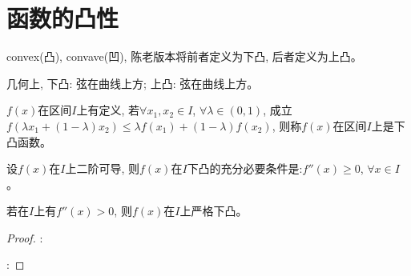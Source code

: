 \section{函数的凸性}
convex(凸), convave(凹), 陈老版本将前者定义为下凸, 后者定义为上凸。

几何上, 下凸: 弦在曲线上方; 上凸: 弦在曲线上方。

\begin{definition}
    $f(x)$在区间$I$上有定义, 若$\forall x_1, x_2 \in I$, $\forall \lambda \in (0, 1)$, 成立$f(\lambda x_1 + (1-\lambda)x_2) \le \lambda f(x_1) + (1-\lambda)f(x_2)$, 则称$f(x)$在区间$I$上是下凸函数。
\end{definition}

\begin{theorem}[二阶导数与凸性的关系]
    设$f(x)$在$I$上二阶可导, 则$f(x)$在$I$下凸的充分必要条件是:$f''(x)\ge 0$, $\forall x \in I$。

    若在$I$上有$f''(x) > 0$, 则$f(x)$在$I$上严格下凸。
\end{theorem}
\begin{proof}
    :

    :
\end{proof}

